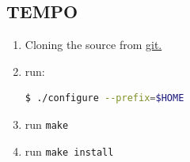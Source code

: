 \documentclass{article}
\begin{document}
    	\subsection{TEMPO}
    	\begin{enumerate}
    		\item Cloning the source from \href{git://git.code.sf.net/p/tempo/tempo}{git.} 
    		\item run: \noindent \begin{lstlisting}[language=bash]
    		$ ./configure --prefix=$HOME
    		\end{lstlisting} 
    		\item run \texttt{make}
    		\item run \texttt{make install}
    	\end{enumerate}

    	
\end{document}
